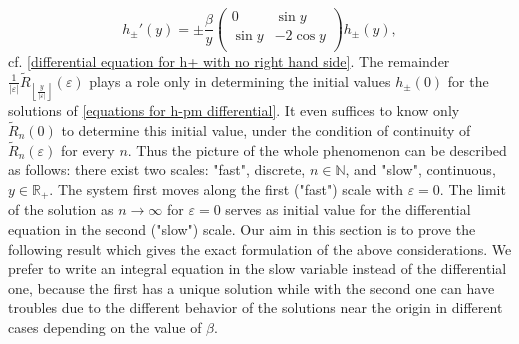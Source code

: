 \documentclass[a4paper,oneside,12pt]{amsart}
\begin{document}
\begin{equation}\label{equations for h-pm differential}
    h_{\pm}'(y)=\pm\frac{\beta}y
    \left(
      \begin{array}{cc}
        0 & \sin y \\
        \sin y & -2\cos y \\
      \end{array}
    \right)
    h_{\pm}(y),
\end{equation}
cf. \eqref{differential equation for h+ with no right hand side}. The remainder $\frac1{|\varepsilon|}\widetilde R_{\left\lfloor\frac{y}{|\varepsilon|}\right\rfloor}(\varepsilon)$ plays a role only in determining the initial values $h_{\pm}(0)$ for the solutions of \eqref{equations for h-pm differential}. It even suffices to know only $\widetilde R_n(0)$ to determine this initial value, under the condition of continuity of $\widetilde R_n(\varepsilon)$ for every $n$. Thus the picture of the whole phenomenon can be described as follows:
there exist two scales: "fast", discrete, $n\in\mathbb N$, and "slow", continuous, $y\in\mathbb R_+$. The system first moves along the first ("fast") scale with $\varepsilon=0$. The limit of the solution as $n\rightarrow\infty$ for $\varepsilon=0$ serves as initial value for the differential equation in the second ("slow") scale. Our aim in this section is to prove the following result which gives the exact formulation of the above considerations. We prefer to write an integral equation in the slow variable instead of the differential one, because the first has a unique solution while with the second one can have troubles due to the different behavior of the solutions near the origin in different cases depending on the value of $\beta$.
\end{document}
